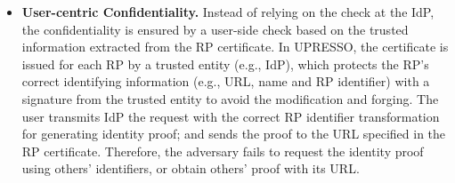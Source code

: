 \begin{itemize}
\item \textbf{User-centric Confidentiality.} 
Instead of relying on the check at the IdP, the confidentiality is ensured by a user-side check based on the trusted information extracted from the RP certificate.
In UPRESSO, the certificate is issued for each RP by a trusted entity (e.g., IdP), which protects the RP's correct identifying information (e.g., URL, name and RP identifier)
 with a signature from the trusted entity to avoid the modification and forging. 
The user transmits IdP the request with the correct RP identifier  transformation for generating identity proof; and sends the proof to the URL specified in the RP certificate. 
Therefore, the adversary fails to request the identity proof using others' identifiers, or obtain others' proof with its URL.
\end{itemize}


